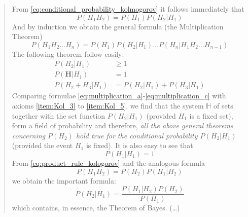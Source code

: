 \documentclass[a4paper,11pt]{book}
\theoremstyle{definition}
\begin{document}
\begin{quotation}
From \eqref{eq:conditional_probability_kolmogorov} it follows immediately that
%
\begin{equation} \label{eq:product_rule_kologorov}
  P(H_1H_2) = P(H_1)P(H_2|H_1)
\end{equation}
%
And by induction we obtain the general formula (the Multiplication Theorem)
%
\begin{equation}
  P(H_1H_2\dots H_n) = P(H_1) P(H_2|H_1) \dots P(H_n|H_1H_2\dots H_{n-1})
\end{equation}
%
The following theorem follow easily:
%
\begin{align}
\label{eq:multiplication_a}  P(H_2|H_1) & \geq 1 \\
\label{eq:multiplication_b}  P(\textbf{H}|H_1) & = 1 \\
\label{eq:multiplication_c} P(H_2 + H_3|H_1) & = P(H_2|H_1) + P(H_3|H_1)
\end{align}
%
Comparing formulae \eqref{eq:multiplication_a}-\eqref{eq:multiplication_c} with axioms \ref{item:Kol_3} to \ref{item:Kol_5}, we find that the system $\mathbb{H}$ of sets together with the set function $P(H_2|H_1)$ (provided $H_1$ is a fixed set), form a field of probability and therefore, \emph{all the above general theorems concerning $P(H_2)$ hold true for the conditional probability $P(H_2|H_1)$} (provided the event $H_1$ is fixed).
%
It is also easy to see that
%
\begin{equation}
  P(H_1|H_1) = 1
\end{equation}
%
From \eqref{eq:product_rule_kologorov} and the analogous formula
%
\begin{equation}
  P(H_1H_2) = P(H_2) P(H_1|H_2)
\end{equation}
%
we obtain the important formula:
%
\begin{equation} \label{eq:bayes_theorem_kolmogorov}
  P(H_2|H_1) = \frac{P(H_1|H_2)P(H_2)}{P(H_1)}
\end{equation}
%
which contains, in essence, the Theorem of Bayes. (\dots)
\end{quotation}

\end{document}
